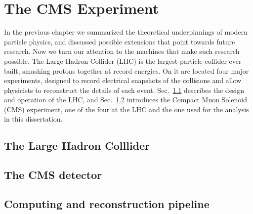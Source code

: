 \chapter{The CMS Experiment}

In the previous chapter we summarized the theoretical underpinnings of modern
particle physics, and discussed possible extensions that point towards
future research. Now we turn our attention to the machines that make such
research possible. The Large Hadron Collider (LHC) is the largest
particle collider ever built, smashing protons together at record energies.
On it are located four major experiments, designed to record electrical
snapshots of the collisions and allow physicists to reconstruct the details
of each event. Sec.~\ref{sec:lhc} describes the design and operation of the LHC,
and Sec.~\ref{sec:cms_det} introduces the Compact Muon Solenoid (CMS) experiment,
one of the four at the LHC and the one used for the analysis in this dissertation.

\section{The Large Hadron Colllider}
\label{sec:lhc}

\section{The CMS detector}
\label{sec:cms_det}

\section{Computing and reconstruction pipeline}
